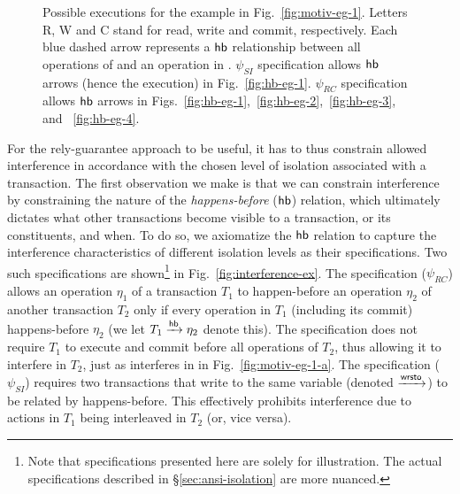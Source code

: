 \begin{figure}
\caption{\small Possible executions for the example in
Fig.~\ref{fig:motiv-eg-1}. Letters R, W and C stand for read, write
and commit, respectively. Each blue dashed arrow represents a $\textsf{hb}$
relationship between all operations of  and an operation in
. $\psi_{SI}$ specification allows $\textsf{hb}$ arrows (hence the
execution) in Fig.~\ref{fig:hb-eg-1}. $\psi_{RC}$ specification allows
$\textsf{hb}$ arrows in
Figs.~\ref{fig:hb-eg-1},~\ref{fig:hb-eg-2},~\ref{fig:hb-eg-3}, and
~\ref{fig:hb-eg-4}.  }
\label{fig:motiv-eg-1-hb}
\vspace*{-8pt}
\end{figure}

For the rely-guarantee approach to be useful, it has to thus constrain
allowed interference in accordance with the chosen level of isolation
associated with a transaction. The first observation we make is that
we can constrain interference by constraining the nature of the
\emph{happens-before} ($\textsf{hb}$) relation, which ultimately dictates
what other transactions become visible to a transaction, or its
constituents, and when. To do so, we axiomatize the $\textsf{hb}$ relation to
capture the interference characteristics of different isolation levels
as their specifications. Two such specifications are
shown\footnote{Note that specifications presented here are solely for
illustration. The actual specifications described in
\S\ref{sec:ansi-isolation} are more nuanced.} in
Fig.~\ref{fig:interference-ex}. The  specification
($\psi_{RC}$) allows an operation $\eta_1$ of a transaction $T_1$ to
happen-before an operation $\eta_2$ of another transaction $T_2$ only
if every operation in $T_1$ (including its commit) happens-before
$\eta_2$ (we let $T_1 \xrightarrow{\textsf{hb}} \eta_2$ denote this). The specification
does not require $T_1$ to execute and commit before all operations of
$T_2$, thus allowing it to interfere in $T_2$, just as 
interferes in  in Fig.~\ref{fig:motiv-eg-1-a}. The
 specification ($\psi_{SI}$) requires two
transactions that write to the same variable (denoted $\xrightarrow{\textsf{wrsto}}$) to be
related by happens-before.  This effectively prohibits interference
due to actions in $T_1$ being interleaved in $T_2$ (or, vice versa). 

